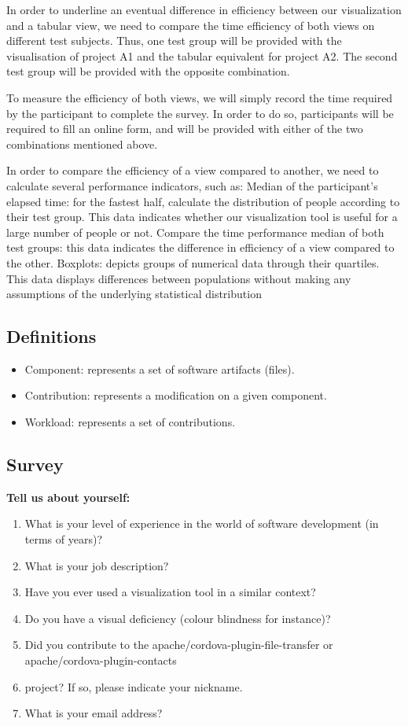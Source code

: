 In order to underline an eventual difference in efficiency between our visualization and a tabular view, we need to compare the time efficiency of both views on different test subjects. Thus, one test group will be provided with the visualisation of project A1 and the tabular equivalent for project A2. The second test group will be provided with the opposite combination.

To measure the efficiency of both views, we will simply record the time required by the participant to complete the survey. In order to do so, participants will be required to fill an online form, and will be provided with either of the two combinations mentioned above.

In order to compare the efficiency of a view compared to another, we need to calculate several performance indicators, such as:
Median of the participant’s elapsed time: for the fastest half, calculate the distribution of people according to their test group. This data indicates whether our visualization tool is useful for a large number of people or not.
Compare the time performance median of both test groups: this data indicates the difference in efficiency of a view compared to the other.
Boxplots: depicts groups of numerical data through their quartiles. This data displays differences between populations without making any assumptions of the underlying statistical distribution


\subsection{Definitions}
\begin{itemize}
\item Component: represents a set of software artifacts (files).
\item Contribution: represents a modification on a given component.
\item Workload: represents a set of contributions.
\end{itemize}

\subsection{Survey}

\textbf{Tell us about yourself:}
\begin{enumerate}
\item What is your level of experience in the world of software development (in terms of years)?
\item What is your job description?
\item Have you ever used a visualization tool in a similar context?
\item Do you have a visual deficiency (colour blindness for instance)?
\item Did you contribute to the apache/cordova-plugin-file-transfer or apache/cordova-plugin-contacts \item project? If so, please indicate your nickname.
\item What is your email address?
\end{enumerate}

